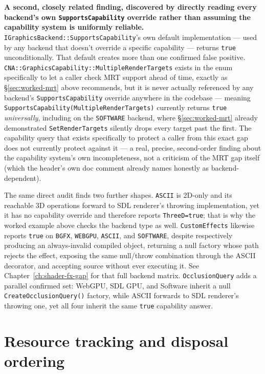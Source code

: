 \begin{sourcenote}
\textbf{A second, closely related finding, discovered by directly reading every backend's own
\texttt{SupportsCapability} override rather than assuming the capability system is uniformly
reliable.} \texttt{IGraphicsBackend::SupportsCapability}'s own default implementation --- used
by any backend that doesn't override a specific capability --- returns \texttt{true}
unconditionally. That default creates more than one confirmed false positive.
\texttt{CNA::GraphicsCapability::MultipleRenderTargets} exists in the enum
specifically to let a caller check MRT support ahead of time, exactly as
\S\ref{sec:worked-mrt} above recommends, but it is never actually referenced by any backend's
\texttt{SupportsCapability} override anywhere in the codebase --- meaning
\texttt{SupportsCapability(MultipleRenderTargets)} currently returns \texttt{true}
\emph{universally}, including on the \texttt{SOFTWARE} backend, where
\S\ref{sec:worked-mrt} already demonstrated \texttt{SetRenderTargets} silently drops every
target past the first. The capability query that exists specifically to protect a caller from
this exact gap does not currently protect against it --- a real, precise, second-order finding
about the capability system's own incompleteness, not a criticism of the MRT gap itself (which
the header's own doc comment already names honestly as backend-dependent).

The same direct audit finds two further shapes. \texttt{ASCII} is 2D-only and its reachable 3D
operations forward to SDL renderer's throwing implementation, yet it has no capability
override and therefore reports \texttt{ThreeD=true}; that is why the worked example above
checks the backend type as well. \texttt{CustomEffects} likewise reports \texttt{true} on
\texttt{BGFX}, \texttt{WEBGPU}, \texttt{ASCII}, and \texttt{SOFTWARE}, despite respectively
producing an always-invalid compiled object, returning a null factory whose
 path rejects the effect, exposing the same null/throw combination
through the ASCII decorator, and accepting source without ever executing it. See
Chapter~\ref{ch:shader-fx-gap} for that full backend matrix. \texttt{OcclusionQuery} adds a
parallel confirmed set: WebGPU, SDL GPU, and Software inherit a null
\texttt{CreateOcclusionQuery()} factory, while ASCII forwards to SDL renderer's throwing one,
yet all four inherit the same \texttt{true} capability answer.
\end{sourcenote}

\section{Resource tracking and disposal ordering}
\label{sec:resource-lifetime}

